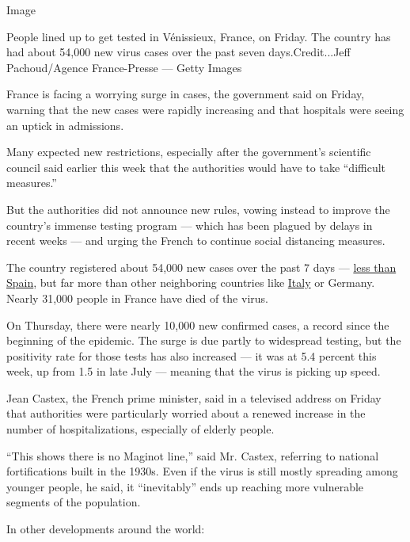 Image

People lined up to get tested in Vénissieux, France, on Friday. The
country has had about 54,000 new virus cases over the past seven
days.Credit...Jeff Pachoud/Agence France-Presse --- Getty Images

France is facing a worrying surge in cases, the government said on
Friday, warning that the new cases were rapidly increasing and that
hospitals were seeing an uptick in admissions.

Many expected new restrictions, especially after the government's
scientific council said earlier this week that the authorities would
have to take ``difficult measures.''

But the authorities did not announce new rules, vowing instead to
improve the country's immense testing program --- which has been plagued
by delays in recent weeks --- and urging the French to continue social
distancing measures.

The country registered about 54,000 new cases over the past 7 days ---
\href{https://www.nytimes3xbfgragh.onion/2020/08/31/world/europe/coronavirus-covid-spain-second-wave.html?searchResultPosition=1}{less
than Spain}, but far more than other neighboring countries like
\href{https://www.nytimes3xbfgragh.onion/2020/09/09/world/europe/coronavirus-sardinia-italy.html}{Italy}
or Germany. Nearly 31,000 people in France have died of the virus.

On Thursday, there were nearly 10,000 new confirmed cases, a record
since the beginning of the epidemic. The surge is due partly to
widespread testing, but the positivity rate for those tests has also
increased --- it was at 5.4 percent this week, up from 1.5 in late July
--- meaning that the virus is picking up speed.

Jean Castex, the French prime minister, said in a televised address on
Friday that authorities were particularly worried about a renewed
increase in the number of hospitalizations, especially of elderly
people.

``This shows there is no Maginot line,'' said Mr. Castex, referring to
national fortifications built in the 1930s. Even if the virus is still
mostly spreading among younger people, he said, it ``inevitably'' ends
up reaching more vulnerable segments of the population.

In other developments around the world:

